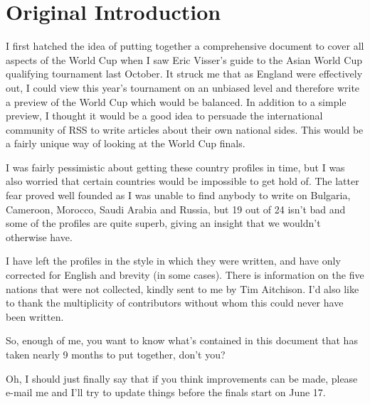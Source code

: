 \chapter{Original Introduction}
\newline
\newline
I first hatched the idea of putting together a comprehensive document to cover 
all aspects of the World Cup when I saw Eric Visser's guide to the Asian World
Cup qualifying tournament last October. It struck me that as England were 
effectively out, I could view this year's tournament on an unbiased level and
therefore write a preview of the World Cup which would be balanced. In addition
to a simple preview, I thought it would be a good idea to persuade the 
international community of RSS to write articles about their own national sides.
This would be a fairly unique way of looking at the World Cup finals.

I was fairly pessimistic about getting these country profiles in time, but I was
also worried that certain countries would be impossible to get hold of. The 
latter fear proved well founded as I was unable to find anybody to write on 
Bulgaria, Cameroon, Morocco, Saudi Arabia and Russia, but 19 out of 24 isn't 
bad and some of the profiles are quite superb, giving an insight that we 
wouldn't otherwise have.

I have left the profiles in the style in which they were written, and have only
corrected for English and brevity (in some cases). There is information on the
five nations that were not collected, kindly sent to me by Tim Aitchison. I'd 
also like to thank the multiplicity of contributors without whom this could
never have been written.

So, enough of me, you want to know what's contained in this document that has 
taken nearly 9 months to put together, don't you?

Oh, I should just finally say that if you think improvements can be made, please 
e-mail me and I'll try to update things before the finals start on June 17.
